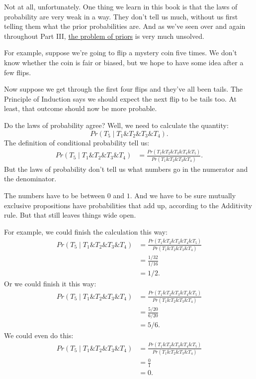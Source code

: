 \documentclass[justified]{tufte-book}
\newcommand{\given}{\mid}
\renewcommand{\wedge}{\mathbin{\&}}
\newcommand{\p}{Pr}
\theoremstyle{definition}
\theoremstyle{definition}
\theoremstyle{definition}
\theoremstyle{remark}
\begin{document}
Not at all, unfortunately. One thing we learn in this book is that the
laws of probability are very weak in a way. They don't tell us much,
without us first telling them what the prior probabilities are. And as
we've seen over and again throughout Part III,
\protect\hyperlink{priors}{the problem of priors} is very much unsolved.

For example, suppose we're going to flip a mystery coin five times. We
don't know whether the coin is fair or biased, but we hope to have some
idea after a few flips.

Now suppose we get through the first four flips and they've all been
tails. The Principle of Induction says we should expect the next flip to
be tails too. At least, that outcome should now be more probable.

Do the laws of probability agree? Well, we need to calculate the
quantity: \[ \p(T_5 \given T_1 \wedge T_2 \wedge T_3 \wedge T_4).\] The
definition of conditional probability tell us: \[
  \begin{aligned}
    \p(T_5 \given T_1 \wedge T_2 \wedge T_3 \wedge T_4) 
      &= \frac{\p(T_1 \wedge T_2 \wedge T_3 \wedge T_4 \wedge T_5)}
              {\p(T_1 \wedge T_2 \wedge T_3 \wedge T_4)}.
  \end{aligned}
\] But the laws of probability don't tell us what numbers go in the
numerator and the denominator.

The numbers have to be between \(0\) and \(1\). And we have to be sure
mutually exclusive propositions have probabilities that add up,
according to the Additivity rule. But that still leaves things wide
open.

For example, we could finish the calculation this way: \[
  \begin{aligned}
    \p(T_5 \given T_1 \wedge T_2 \wedge T_3 \wedge T_4) 
      &= \frac{\p(T_1 \wedge T_2 \wedge T_3 \wedge T_4 \wedge T_5)}
              {\p(T_1 \wedge T_2 \wedge T_3 \wedge T_4)}\\
      &= \frac{1/32}{1/16}\\
      &= 1/2.
  \end{aligned}
\] Or we could finish it this way: \[
  \begin{aligned}
    \p(T_5 \given T_1 \wedge T_2 \wedge T_3 \wedge T_4) 
      &= \frac{\p(T_1 \wedge T_2 \wedge T_3 \wedge T_4 \wedge T_5)}
              {\p(T_1 \wedge T_2 \wedge T_3 \wedge T_4)}\\
      &= \frac{5/20}{6/20}\\
      &= 5/6.
  \end{aligned}
\] We could even do this: \[
  \begin{aligned}
    \p(T_5 \given T_1 \wedge T_2 \wedge T_3 \wedge T_4) 
      &= \frac{\p(T_1 \wedge T_2 \wedge T_3 \wedge T_4 \wedge T_5)}
              {\p(T_1 \wedge T_2 \wedge T_3 \wedge T_4)}\\
      &= \frac{0}{1}\\
      &= 0.
  \end{aligned}
\]
\end{document}

